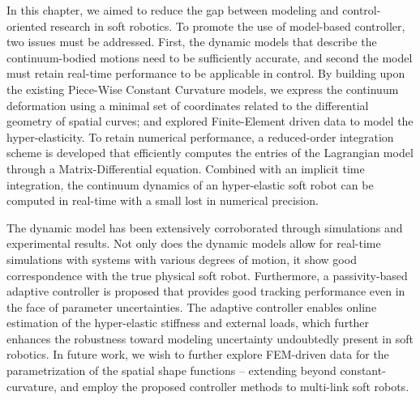 
\noindent In this chapter, we aimed to reduce the gap between modeling and control-oriented research in soft robotics. To promote the use of model-based controller, two issues must be addressed. First, the dynamic models that describe the continuum-bodied motions need to be sufficiently accurate, and second the model must retain real-time performance to be applicable in control. By building upon the existing Piece-Wise Constant Curvature models, we express the continuum deformation using a minimal set of coordinates related to the differential geometry of spatial curves; and explored Finite-Element driven data to model the hyper-elasticity. To retain numerical performance, a reduced-order integration scheme is developed that efficiently computes the entries of the Lagrangian model through a Matrix-Differential equation. Combined with an implicit time integration, the continuum dynamics of an hyper-elastic soft robot can be computed in real-time with a small lost in numerical precision. 

The dynamic model has been extensively corroborated through simulations and experimental results. Not only does the dynamic models allow for real-time simulations with systems with various degrees of motion, it show good correspondence with the true physical soft robot. Furthermore, a passivity-based adaptive controller is proposed that provides good tracking performance even in the face of parameter uncertainties. The adaptive controller enables online estimation of the hyper-elastic stiffness and external loads, which further enhances the robustness toward modeling uncertainty undoubtedly present in soft robotics. In future work, we wish to further explore FEM-driven data for the parametrization of the spatial shape functions -- extending beyond constant-curvature, and employ the proposed controller methods to multi-link soft robots.
